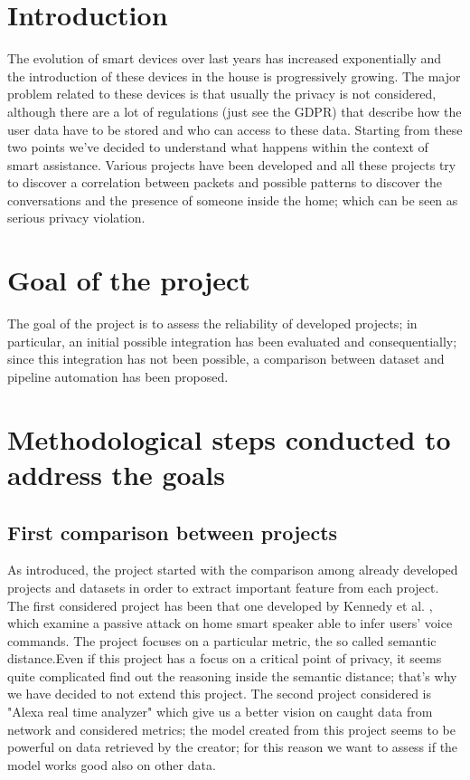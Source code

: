 \documentclass[sigconf]{acmart}
\begin{document}
    \section{Introduction}
    The evolution of smart devices over last years has increased exponentially and the introduction of these devices in the house is progressively growing.
    The major problem related to these devices is that usually the privacy is not considered, although there are a lot of regulations (just see the GDPR) that describe how the user data have to be stored and who can access to these data.
    Starting from these two points we've decided to understand what happens within the context of smart assistance.
    Various projects have been developed and all these projects try to discover a correlation between packets and possible patterns to discover the conversations and the presence of someone inside the home; which can be seen as serious privacy violation. 

\section{Goal of the project}
The goal of the project is to assess the reliability of developed projects; in particular, an initial possible integration has been evaluated and consequentially; since this integration has not been possible, a comparison between dataset and pipeline automation has been proposed. 

\section{Methodological steps conducted to address the goals}
\subsection{First comparison between projects}
As introduced, the project started with the comparison among already developed projects and datasets in order to extract important feature from each project. The first considered project has been that one developed by Kennedy et al. \cite{Kennedy}, which examine a passive attack on home smart speaker able to infer users' voice commands. The project focuses on a particular metric, the so called semantic distance.Even if this project has a focus on a critical point of privacy, it seems  quite complicated find out the reasoning inside the semantic distance; that's why we have decided to not extend this project. The second project considered is "Alexa real time analyzer" which give us a better vision on caught data from network and considered metrics; the model created from this project seems to be powerful on data retrieved by the creator; for this reason we want to assess if the model works good also on other data.
\end{document}

